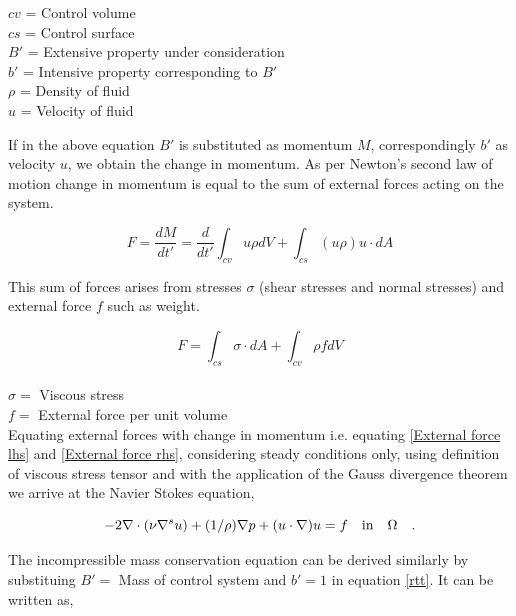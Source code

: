 \documentclass[a4paper]{book}
\begin{document}
\begin{center}
$cv$ = Control volume\\
$cs$ = Control surface\\
$B'$ = Extensive property under consideration  \\
$b'$ = Intensive property corresponding to $B'$ \\
$\rho$ = Density of fluid \\
$u$ = Velocity of fluid\\
\end{center}

If in the above equation $B'$ is substituted as momentum $M$, correspondingly $b'$ as velocity $u$, we obtain the change in momentum. As per Newton's second law of motion change in momentum is equal to the sum of external forces acting on the system. 

\begin{equation}\label{External force lhs}
F = \frac{dM}{dt'} = \frac{d}{dt'} \int_{cv} u \rho dV + \int_{cs} (u \rho) u\cdot dA 
\end{equation}

This sum of forces arises from stresses $\sigma$ (shear stresses and normal stresses) and external force $f$ such as weight. 

\begin{equation}\label{External force rhs}
F = \int_{cs} \sigma \cdot dA + \int_{cv} \rho f dV
\end{equation}
\\
$\sigma =$ Viscous stress\\
$f =$ External force per unit volume\\

Equating external forces with change in momentum i.e. equating \eqref{External force lhs} and \eqref{External force rhs}, considering steady conditions only, using definition of viscous stress tensor and with the application of the Gauss divergence theorem we arrive at the Navier Stokes equation,

\begin{equation} \label{navier_stokes}
-2\nabla \cdot (\nu \nabla^s u) + (1/\rho) \nabla p + (u \cdot \nabla)u = f \quad   \textnormal{in}  \quad \Omega \quad \textrm{.}
\end{equation} 

The incompressible mass conservation equation can be derived similarly by substituing $B' =$ Mass of control system and $b' = 1$ in equation \eqref{rtt}.  It can be written as,
\end{document}
